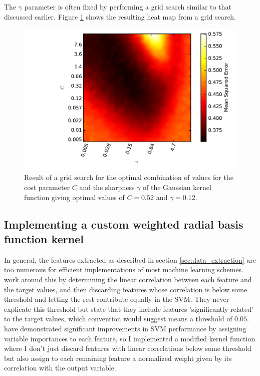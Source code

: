 The $\gamma$ parameter is often fixed by performing a grid search similar to that discussed earlier. Figure \ref{fig:grid_search_gamma_c} shows the resulting heat map from a grid search.
\begin{figure}
	\centering
	\includegraphics[width = \figwidth]{pics/ml/15_07_20_grid_search_g_thr_extra.pdf}
	\caption{Result of a grid search for the optimal combination of values for the cost parameter $C$ and the sharpness $\gamma$ of the Gaussian kernel function giving optimal values of $C = 0.52$ and $\gamma = 0.12$.}
	\label{fig:grid_search_gamma_c}
\end{figure}

\FloatBarrier
\subsection{Implementing a custom weighted radial basis function kernel}
In general, the features extracted as described in section \ref{sec:data_extraction} are too numerous for efficient implementations of most machine learning schemes. \cite{demontjoye2013} work around this by determining the linear correlation between each feature and the target values, and then discarding features whose correlation is below some threshold and letting the rest contribute equally in the SVM. They never explicate this threshold but state that they include features 'significantly related' to the target values, which convention would suggest means a threshold of $0.05$. \cite{Pietersma2011} have demonstrated significant improvements in SVM performance by assigning variable importances to each feature, so I implemented a modified kernel function where I don't just discard features with linear correlations below some threshold but also assign to each remaining feature a normalized weight given by its correlation with the output variable.


